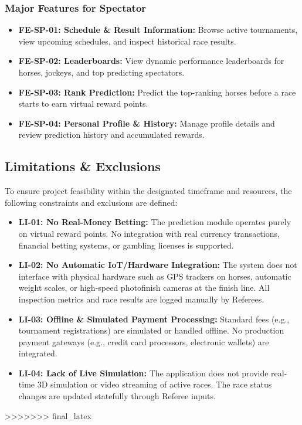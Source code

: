 \subsubsection{Major Features for Spectator}
\begin{itemize}
    \item \textbf{FE-SP-01: Schedule \& Result Information:} Browse active tournaments, view upcoming schedules, and inspect historical race results.
    \item \textbf{FE-SP-02: Leaderboards:} View dynamic performance leaderboards for horses, jockeys, and top predicting spectators.
    \item \textbf{FE-SP-03: Rank Prediction:} Predict the top-ranking horses before a race starts to earn virtual reward points.
    \item \textbf{FE-SP-04: Personal Profile \& History:} Manage profile details and review prediction history and accumulated rewards.
\end{itemize}

\subsection{Limitations \& Exclusions}
To ensure project feasibility within the designated timeframe and resources, the following constraints and exclusions are defined:
\begin{itemize}
    \item \textbf{LI-01: No Real-Money Betting:} The prediction module operates purely on virtual reward points. No integration with real currency transactions, financial betting systems, or gambling licenses is supported.
    \item \textbf{LI-02: No Automatic IoT/Hardware Integration:} The system does not interface with physical hardware such as GPS trackers on horses, automatic weight scales, or high-speed photofinish cameras at the finish line. All inspection metrics and race results are logged manually by Referees.
    \item \textbf{LI-03: Offline \& Simulated Payment Processing:} Standard fees (e.g., tournament registrations) are simulated or handled offline. No production payment gateways (e.g., credit card processors, electronic wallets) are integrated.
    \item \textbf{LI-04: Lack of Live Simulation:} The application does not provide real-time 3D simulation or video streaming of active races. The race status changes are updated statefully through Referee inputs.
\end{itemize}
>>>>>>> final_latex
